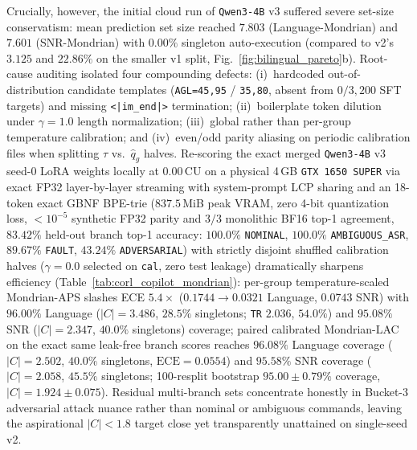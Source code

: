 \documentclass[10pt]{article}
\begin{document}
Crucially, however, the initial cloud run of \texttt{Qwen3-4B} v3 suffered severe set-size conservatism: mean prediction set size reached $7.803$ (Language-Mondrian) and $7.601$ (SNR-Mondrian) with $0.00\%$ singleton auto-execution (compared to v2's $3.125$ and $22.86\%$ on the smaller v1 split, Fig.~\ref{fig:bilingual_pareto}b). Root-cause auditing isolated four compounding defects: (i)~hardcoded out-of-distribution candidate templates (\texttt{AGL=45,95} / \texttt{35,80}, absent from $0/3{,}200$ SFT targets) and missing \texttt{<|im\_end|>} termination; (ii)~boilerplate token dilution under $\gamma=1.0$ length normalization; (iii)~global rather than per-group temperature calibration; and (iv)~even/odd parity aliasing on periodic calibration files when splitting $\tau$ vs.\ $\hat{q}_g$ halves. Re-scoring the exact merged \texttt{Qwen3-4B} v3 seed-0 LoRA weights locally at $0.00$\,CU on a physical 4\,GB \texttt{GTX~1650~SUPER} via exact FP32 layer-by-layer streaming with system-prompt LCP sharing and an 18-token exact GBNF BPE-trie ($837.5$\,MiB peak VRAM, zero 4-bit quantization loss, $<10^{-5}$ synthetic FP32 parity and $3/3$ monolithic BF16 top-1 agreement, $83.42\%$ held-out branch top-1 accuracy: $100.0\%$ \texttt{NOMINAL}, $100.0\%$ \texttt{AMBIGUOUS\_ASR}, $89.67\%$ \texttt{FAULT}, $43.24\%$ \texttt{ADVERSARIAL}) with strictly disjoint shuffled calibration halves ($\gamma=0.0$ selected on \texttt{cal}, zero test leakage) dramatically sharpens efficiency (Table~\ref{tab:corl_copilot_mondrian}): per-group temperature-scaled Mondrian-APS slashes ECE $5.4\times$ ($0.1744 \to 0.0321$ Language, $0.0743$ SNR) with $96.00\%$ Language ($|C|=3.486$, $28.5\%$ singletons; \texttt{TR} $2.036$, $54.0\%$) and $95.08\%$ SNR ($|C|=2.347$, $40.0\%$ singletons) coverage; paired calibrated Mondrian-LAC on the exact same leak-free branch scores reaches $96.08\%$ Language coverage ($|C|=2.502$, $40.0\%$ singletons, $\text{ECE}=0.0554$) and $95.58\%$ SNR coverage ($|C|=2.058$, $45.5\%$ singletons; 100-resplit bootstrap $95.00 \pm 0.79\%$ coverage, $|C|=1.924 \pm 0.075$). Residual multi-branch sets concentrate honestly in Bucket-3 adversarial attack nuance rather than nominal or ambiguous commands, leaving the aspirational $|C|<1.8$ target close yet transparently unattained on single-seed v2.
\end{document}
